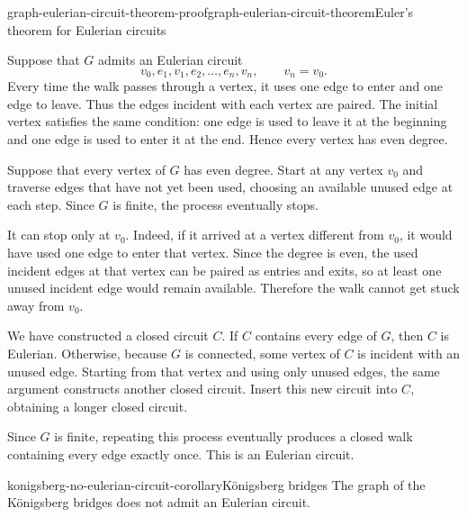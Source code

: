\documentclass[preview]{standalone}
\begin{document}
\begin{snippetproof}{graph-eulerian-circuit-theorem-proof}{graph-eulerian-circuit-theorem}{Euler's theorem for Eulerian circuits}
    \begin{iffproof}
        \item Suppose that \(G\) admits an Eulerian circuit
        \[
            v_0,e_1,v_1,e_2,\ldots,e_n,v_n,
            \qquad v_n=v_0.
        \]
        Every time the walk passes through a vertex, it uses one edge to enter
        and one edge to leave. Thus the edges incident with each vertex are
        paired. The initial vertex satisfies the same condition: one edge is
        used to leave it at the beginning and one edge is used to enter it at
        the end. Hence every vertex has even degree.

        \item Suppose that every vertex of \(G\) has even degree.
        Start at any vertex \(v_0\) and traverse edges that have not yet been
        used, choosing an available unused edge at each step. Since \(G\) is
        finite, the process eventually stops.

        It can stop only at \(v_0\). Indeed, if it arrived at a vertex
        different from \(v_0\), it would have used one edge to enter that
        vertex. Since the degree is even, the used incident edges at that
        vertex can be paired as entries and exits, so at least one unused
        incident edge would remain available. Therefore the walk cannot get
        stuck away from \(v_0\).

        We have constructed a closed circuit \(C\). If \(C\) contains every
        edge of \(G\), then \(C\) is Eulerian. Otherwise, because \(G\) is
        connected, some vertex of \(C\) is incident with an unused edge.
        Starting from that vertex and using only unused edges, the same
        argument constructs another closed circuit. Insert this new circuit
        into \(C\), obtaining a longer closed circuit.

        Since \(G\) is finite, repeating this process eventually produces a
        closed walk containing every edge exactly once. This is an Eulerian
        circuit.
    \end{iffproof}
\end{snippetproof}

\begin{snippetcorollary}{konigsberg-no-eulerian-circuit-corollary}{Königsberg bridges}
    The graph of the Königsberg bridges does not admit an Eulerian circuit.
\end{snippetcorollary}
\end{document}
